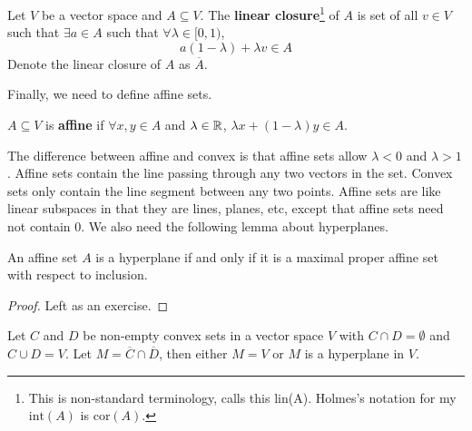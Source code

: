 \begin{definition}
  Let $V$ be a vector space and $A \subseteq V$. The \textbf{linear
    closure}\footnote{This is non-standard terminology,
    \cite{holmes1975} calls this lin(A). Holmes's notation for my
    $\mathrm{int}(A)$ is $\mathrm{cor}(A)$.} of $A$ is set
  of all $v \in V$ such that $\exists a \in A$ such that
  $\forall \lambda \in [0,1)$,
  \[ a(1-\lambda) + \lambda v \in A \]
  Denote the linear closure of $A$ as $\overline{A}$.
\end{definition}
Finally, we need to define affine sets.
\begin{definition}
  $A \subseteq V$ is \textbf{affine} if $\forall x, y \in A$ and $\lambda \in
  \mathbb{R}$, $\lambda x + (1-\lambda)y \in A$.
\end{definition}
The difference between affine and convex is that affine sets allow
$\lambda <0$ and $\lambda >1$. Affine sets contain the line passing
through any two vectors in the set. Convex sets only contain the line
segment between any two points. Affine sets are like linear subspaces
in that they are lines, planes, etc, except that affine sets need not
contain $0$.  We also need the following lemma about hyperplanes.
\begin{lemma}
  An affine set $A$ is a hyperplane if and only if it is a maximal
  proper affine set with respect to inclusion.
\end{lemma}
\begin{proof}
  Left as an exercise.
\end{proof}
\begin{lemma}\label{lem:compconvex}
  Let $C$ and $D$ be non-empty convex sets in a vector space
  $V$ with $C \cap D = \emptyset$ and $C \cup D = V$. Let
  $M = \overline{C} \cap \overline{D}$, then either $M = V$ or $M$ is
  a hyperplane in $V$.
\end{lemma}

